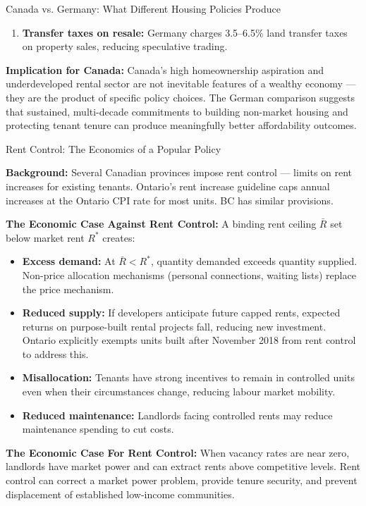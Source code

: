 \begin{casestudy}{Canada vs. Germany: What Different Housing Policies Produce}
\begin{enumerate}
  \item \textbf{Transfer taxes on resale:} Germany charges 3.5--6.5\%
        land transfer taxes on property sales, reducing speculative trading.
\end{enumerate}

\textbf{Implication for Canada:} Canada's high homeownership aspiration and
underdeveloped rental sector are not inevitable features of a wealthy economy ---
they are the product of specific policy choices. The German comparison suggests
that sustained, multi-decade commitments to building non-market housing and
protecting tenant tenure can produce meaningfully better affordability outcomes.
\end{casestudy}

\begin{casestudy}{Rent Control: The Economics of a Popular Policy}

\textbf{Background:} Several Canadian provinces impose rent control ---
limits on rent increases for existing tenants. Ontario's rent increase
guideline caps annual increases at the Ontario CPI rate for most units.
BC has similar provisions.

\textbf{The Economic Case Against Rent Control:}
A binding rent ceiling $\bar{R}$ set below market rent $R^*$ creates:
\begin{itemize}
  \item \textbf{Excess demand:} At $\bar{R} < R^*$, quantity demanded
        exceeds quantity supplied. Non-price allocation mechanisms
        (personal connections, waiting lists) replace the price mechanism.
  \item \textbf{Reduced supply:} If developers anticipate future capped
        rents, expected returns on purpose-built rental projects fall,
        reducing new investment. Ontario explicitly exempts units built
        after November 2018 from rent control to address this.
  \item \textbf{Misallocation:} Tenants have strong incentives to remain
        in controlled units even when their circumstances change, reducing
        labour market mobility.
  \item \textbf{Reduced maintenance:} Landlords facing controlled rents
        may reduce maintenance spending to cut costs.
\end{itemize}

\textbf{The Economic Case For Rent Control:}
When vacancy rates are near zero, landlords have market power and can
extract rents above competitive levels. Rent control can correct a market
power problem, provide tenure security, and prevent displacement of
established low-income communities.


\end{casestudy}
